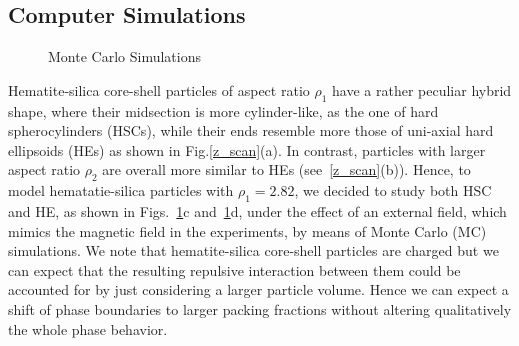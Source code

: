 \documentclass[aps,prl,preprint,superscriptaddress]{revtex4-1} %
\begin{document}
\subsection{Computer Simulations}
\begin{figure}[ht]
\caption{Monte Carlo Simulations}\label{fig:sim}
\end{figure}
Hematite-silica core-shell particles of aspect ratio $\rho_1$
have a rather peculiar hybrid shape, where their midsection is more cylinder-like, as the one of hard spherocylinders 
(HSCs), while their ends resemble more those of uni-axial hard ellipsoids (HEs) as shown in Fig.\ref{z_scan}(a).
In contrast, particles with larger aspect ratio $\rho_2$ are overall more similar to HEs (see~\ref{z_scan}(b)).
Hence, to model hematatie-silica particles with $\rho_1=2.82$, we decided to study both HSC and HE, as shown in Figs.~\ref{fig:sim}c and~\ref{fig:sim}d, 
under the effect of an external field, which mimics the magnetic field in the experiments, by means of Monte Carlo (MC) simulations.
We note that hematite-silica core-shell particles are charged but we can expect that the resulting repulsive interaction between them 
could be accounted for by just considering a larger particle volume. Hence we can expect a shift of phase boundaries to larger packing fractions
without altering qualitatively the whole phase behavior.
\end{document}
